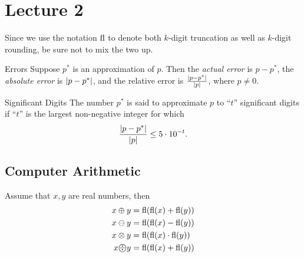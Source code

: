 \documentclass[class=article, crop=false]{standalone}
\begin{document}
  \section{Lecture 2}
  \begin{note}{}
    Since we use the notation $\operatorname{fl}$ to denote both $k$-digit truncation as well as $k$-digit rounding, be sure not to mix the two up.
  \end{note}
  \begin{definition}{Errors}
    Suppose $p^*$ is an approximation of $p$. Then the \emph{actual error} is $p - p^*$, the \emph{absolute error} is $\left\lvert p - p^* \right\rvert$, and the relative error is $\frac{\left\lvert p - p^* \right\rvert}{\left\lvert p \right\rvert}$, where $p\neq 0$.
  \end{definition}
  \begin{definition}{Significant Digits}
    The number $p^*$ is said to approximate $p$ to ``$t$'' significant digits if ``$t$'' is the largest non-negative integer for which
    \[
      \frac{\left\lvert p - p^* \right\rvert}{\left\lvert p \right\rvert}\leq 5\cdot 10^{-t}.
    \]
  \end{definition}
  \subsection{Computer Arithmetic}
  Assume that $x, y$ are real numbers, then
  \begin{align*}
    x\oplus y &= \operatorname{fl}(\operatorname{fl}(x) + \operatorname{fl}(y)) \\ 
    x\ominus y &= \operatorname{fl}(\operatorname{fl}(x) - \operatorname{fl}(y)) \\ 
    x\otimes y &= \operatorname{fl}(\operatorname{fl}(x) \cdot  \operatorname{fl}(y)) \\ 
    x \text{\textcircled{$\div$}} y &= \operatorname{fl}(\operatorname{fl}(x) + \operatorname{fl}(y))
  \end{align*}
\end{document}
